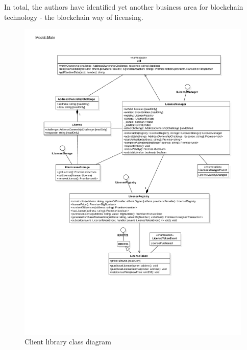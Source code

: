 \documentclass{egpubl}
\begin{document}
In total, the authors have identified yet another business area for blockchain technology - the blockchain way of licensing. 


%




\begin{figure}[h]
	\centering
	\setlength{\fboxsep}{1pt}
   	\setlength{\fboxrule}{1pt}	
	\includegraphics[width=1\linewidth]{images/class-diagram.pdf}
	\caption{Client library class diagram}
	\label{img:classDiagram}
\end{figure}

\FloatBarrier
\end{document}
